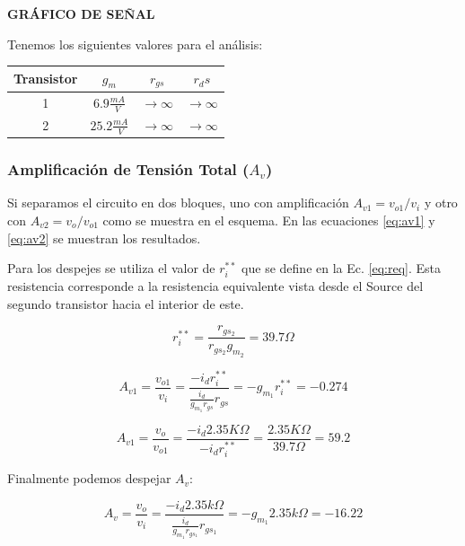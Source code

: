 \documentclass[a4paper, 10pt, spanish]{article}
\begin{document}
\textbf{GRÁFICO DE SEÑAL}

Tenemos los siguientes valores para el análisis:
\begin{center}
   \begin{tabular}{|c|c|c|c|}
     \hline
    Transistor & $g_m$ & $r_{gs}$ & $r_ds$  \\
    \hline
    1 & $6.9\frac{mA}{V}$ & $\rightarrow \infty$ & $\rightarrow \infty$ \\
    \hline
    2 & $25.2\frac{mA}{V}$ & $\rightarrow \infty$ & $\rightarrow \infty$ \\
    \hline
   \end{tabular}
\end{center}

\subsubsection{Amplificación de Tensión Total ($A_v$)}

Si separamos el circuito en dos bloques, uno con amplificación $A_{v1}=v_{o1}/v_i$ y otro con $A_{v2}=v_o/v_{o1}$ como se muestra en el esquema. En las ecuaciones \ref{eq:av1} y \ref{eq:av2} se muestran los resultados.

Para los despejes se utiliza el valor de $r_i^{**}$ que se define en la Ec. \ref{eq:req}. Esta resistencia corresponde a la resistencia equivalente vista desde el Source del segundo transistor hacia el interior de este.

\begin{equation}
  r_i^{**}=\frac{r_{gs_2}}{r_{gs_2} g_{m_2}} = 39.7 \Omega
  \label{eq:req}
\end{equation}

\begin{equation}
  A_{v1}=\frac{v_{o1}}{v_i}=\frac{-i_d r_i^{**}}{\frac{i_d}{g_{m_1} r_{gs}}r_{gs}}=-g_{m_1} r_i^{**} = -0.274
  \label{eq:av1}
\end{equation}

\begin{equation}
  A_{v1}=\frac{v_{o}}{v_{o1}}=\frac{-i_d 2.35K\Omega}{-i_d r_i^{**}}=\frac{2.35K\Omega}{39.7\Omega} = 59.2
  \label{eq:av2}
\end{equation}

Finalmente podemos despejar $A_v$:

\begin{equation}
  A_v=\frac{v_o}{v_i}=\frac{-i_d 2.35k\Omega}{\frac{i_d}{ g_{m_1} r_{gs_1} } r_{gs_1} } = -g_{m_1} 2.35k\Omega = -16.22
  \label{eq:av}
\end{equation}
\end{document}
